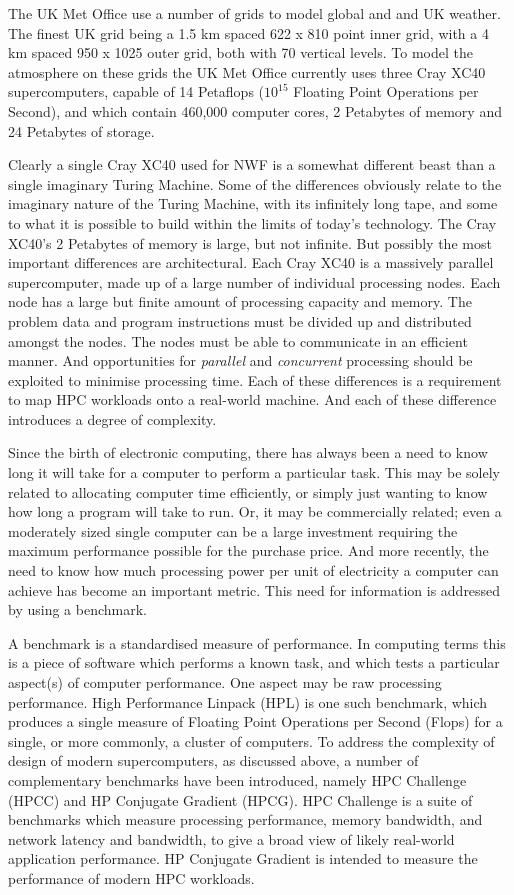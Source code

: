 \documentclass{report}
\begin{document}
The UK Met Office use a number of grids to model global and and UK weather. The finest UK grid being a 1.5 km spaced 622 x 810 point inner grid, with a 4 km spaced 950 x 1025 outer grid, both with 70 vertical levels. To model the atmosphere on these grids the UK Met Office currently uses three Cray XC40 supercomputers, capable of 14 Petaflops ($10^{15}$ Floating Point Operations per Second), and which contain 460,000 computer cores, 2 Petabytes of memory and 24 Petabytes of storage.

Clearly a single Cray XC40 used for NWF is a somewhat different beast than a single imaginary Turing Machine. Some of the differences obviously relate to the imaginary nature of the Turing Machine, with its infinitely long tape, and some to what it is possible to build within the limits of today's technology. The Cray XC40's 2 Petabytes of memory is large, but not infinite. But possibly the most important differences are architectural. Each Cray XC40 is a massively parallel supercomputer, made up of a large number of individual processing nodes. Each node has a large but finite amount of processing capacity and memory. The problem data and program instructions must be divided up and distributed amongst the nodes. The nodes must be able to communicate in an efficient manner. And opportunities for \emph{parallel} and \emph{concurrent} processing should be exploited to minimise processing time. Each of these differences is a requirement to map HPC workloads onto a real-world machine. And each of these difference introduces a degree of complexity.   

Since the birth of electronic computing, there has always been a need to know long it will take for a computer to perform a particular task. This may be solely related to allocating computer time efficiently, or simply just wanting to know how long a program will take to run. Or, it may be commercially related; even a moderately sized single computer can be a large investment requiring the maximum performance possible for the purchase price. And more recently, the need to know how much processing power per unit of electricity a computer can achieve has become an important metric. This need for information is addressed by using a benchmark.

A benchmark is a standardised measure of performance. In computing terms this is a piece of software which performs a known task, and which tests a particular aspect(s) of computer performance. One aspect may be raw processing performance. High Performance Linpack (HPL) is one such benchmark, which produces a single measure of Floating Point Operations per Second (Flops) for a single, or more commonly, a cluster of computers. To address the complexity of design of modern supercomputers, as discussed above, a number of complementary benchmarks have been introduced, namely HPC Challenge (HPCC) and HP Conjugate Gradient (HPCG). HPC Challenge is a suite of benchmarks which measure processing performance, memory bandwidth, and network latency and bandwidth, to give a broad view of likely real-world application performance. HP Conjugate Gradient is intended to measure the performance of modern HPC workloads.
\end{document}
